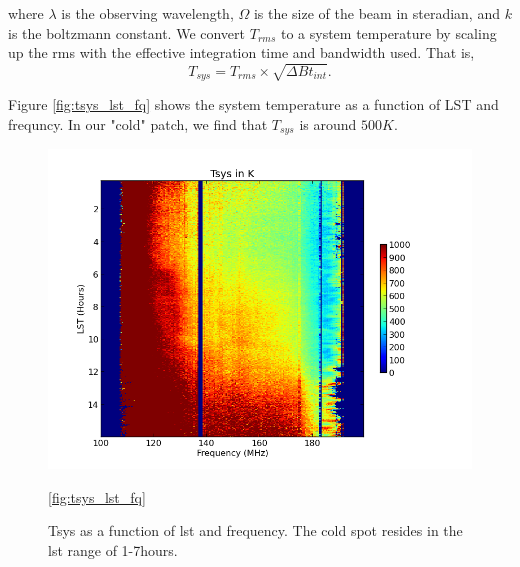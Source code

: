 \documentclass[twocolumn,numberedappendix]{emulateapj}
\begin{document}
{where $\lambda$ is the observing wavelength, $\Omega$ is the size of the beam in
steradian, and $k$ is the boltzmann constant. We convert $T_{rms}$ to a system
temperature by scaling up the rms with the effective integration time and
bandwidth used. That is, 
\begin{equation}
    T_{sys} = T_{rms} \times \sqrt{\Delta{B}t_{int}}.
\end{equation}

Figure \ref{fig:tsys_lst_fq} shows the system temperature as a function of
LST and frequncy. In our "cold" patch, we find that $T_{sys}$ is around $500K$.


\begin{figure}
\centering
\includegraphics[width=\columnwidth]{plots/tsys_lst_freq.png}
\caption{Tsys as a function of lst and frequency. The cold spot resides in the
lst range of 1-7hours.}
\ref{fig:tsys_lst_fq}
\end{figure}






}
\end{document}
